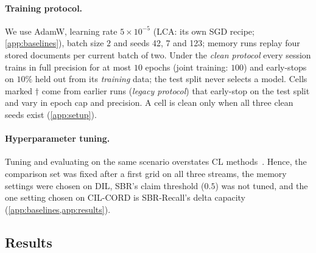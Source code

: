 \documentclass[10pt,twocolumn,letterpaper]{article}
\begin{document}
\paragraph{Training protocol.}\label{sec:protocol} We use AdamW, learning rate $5{\times}10^{-5}$ (LCA: its own SGD recipe; \cref{app:baselines}), batch size $2$ and seeds 42, 7 and 123; memory runs replay four stored documents per current batch of two. Under the \emph{clean protocol} every session trains in full precision for at most $10$ epochs (joint training: $100$) and early-stops on $10\%$ held out from its \emph{training} data; the test split never selects a model. Cells marked $\dagger$ come from earlier runs (\emph{legacy protocol}) that early-stop on the test split and vary in epoch cap and precision. A cell is clean only when all three clean seeds exist (\cref{app:setup}).

\paragraph{Hyperparameter tuning.} Tuning and evaluating on the same scenario overstates CL methods~\citep{cha2025hyperparameters}. Hence, the comparison set was fixed after a first grid on all three streams, the memory settings were chosen on DIL, SBR's claim threshold ($0.5$) was not tuned, and the one setting chosen on CIL-CORD is SBR-Recall's delta capacity (\cref{app:baselines,app:results}).

\begin{table}[t]
\centering\small
\setlength{\tabcolsep}{4pt}
\caption{\textbf{Comparison with continual-learning baselines} on LayoutLMv3 over six streams. F1: full-label F1; AA and AF: average accuracy and forgetting (\cref{sec:setup}). AA and F1: mean $\pm$ s.d. over three seeds, per-seed values when fewer; AF: mean; ``--'': not run. Bold: best of each column, Joint training aside; underlined: our best when a baseline is best. $^\dagger$legacy protocol; $^{n=k}$: $k$ clean seeds so far; $^{c}$one fp16 LwF seed that collapsed to all-background is excluded; $^{b}$with the $50$-document memory; on CIL-WildReceipt and DIL-XFUND, ER keeps $200$ documents and DER++ $250$; on CIL-FUNSD both keep $20$, the memory of the CoLaR cells there; $^{p}$made before we fixed our port's orthogonality penalty. Ports and protocols: \cref{app:baselines}; what each method stores: \cref{tab:memcmp}.}
\label{tab:main}
\resizebox{\linewidth}{!}{}
\end{table}

\subsection{Results}
\label{sec:beyond}
\end{document}
